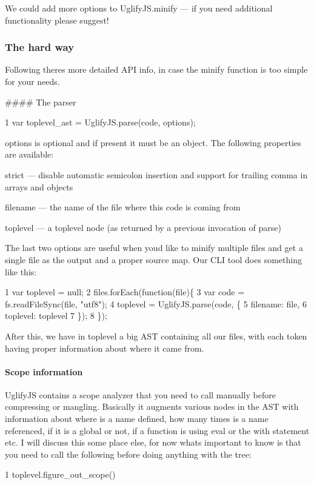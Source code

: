 We could add more options to {\ttfamily Uglify\+J\+S.\+minify} — if you need additional functionality please suggest!

\subsubsection*{The hard way}

Following there\textquotesingle{}s more detailed A\+P\+I info, in case the {\ttfamily minify} function is too simple for your needs.

\#\#\#\# The parser 
\begin{DoxyCode}
1 var toplevel\_ast = UglifyJS.parse(code, options);
\end{DoxyCode}


{\ttfamily options} is optional and if present it must be an object. The following properties are available\+:


\begin{DoxyItemize}
\item {\ttfamily strict} — disable automatic semicolon insertion and support for trailing comma in arrays and objects
\item {\ttfamily filename} — the name of the file where this code is coming from
\item {\ttfamily toplevel} — a {\ttfamily toplevel} node (as returned by a previous invocation of {\ttfamily parse})
\end{DoxyItemize}

The last two options are useful when you\textquotesingle{}d like to minify multiple files and get a single file as the output and a proper source map. Our C\+L\+I tool does something like this\+: 
\begin{DoxyCode}
1 var toplevel = null;
2 files.forEach(function(file)\{
3     var code = fs.readFileSync(file, "utf8");
4     toplevel = UglifyJS.parse(code, \{
5         filename: file,
6         toplevel: toplevel
7     \});
8 \});
\end{DoxyCode}


After this, we have in {\ttfamily toplevel} a big A\+S\+T containing all our files, with each token having proper information about where it came from.

\paragraph*{Scope information}

Uglify\+J\+S contains a scope analyzer that you need to call manually before compressing or mangling. Basically it augments various nodes in the A\+S\+T with information about where is a name defined, how many times is a name referenced, if it is a global or not, if a function is using {\ttfamily eval} or the {\ttfamily with} statement etc. I will discuss this some place else, for now what\textquotesingle{}s important to know is that you need to call the following before doing anything with the tree\+: 
\begin{DoxyCode}
1 toplevel.figure\_out\_scope()
\end{DoxyCode}


